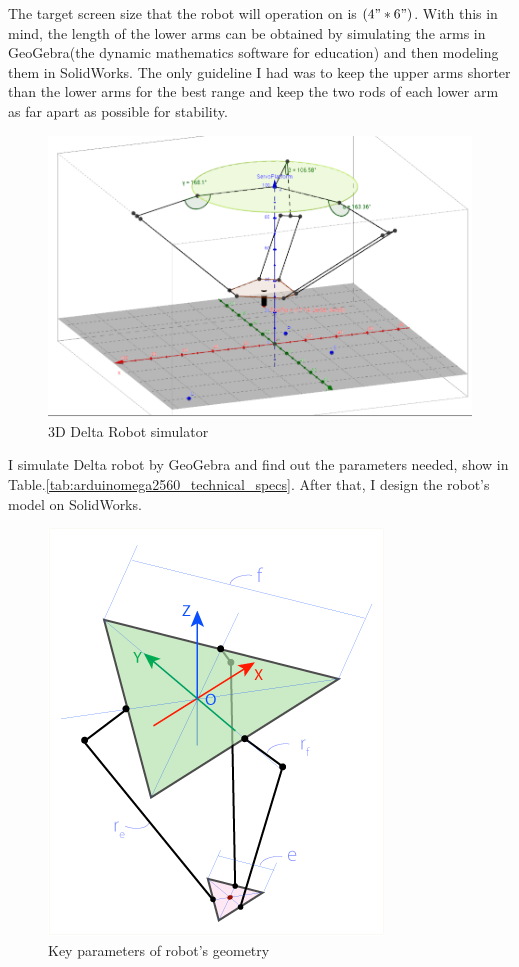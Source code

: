 The target screen size that the robot will operation on is $(4" \ast 6")$. With this in mind, the length of the lower arms can be obtained by simulating the arms in GeoGebra\cite{GeoGebra_thesis}(the dynamic mathematics software for education) and then modeling them in SolidWorks. The only guideline I had was to keep the upper arms shorter than the lower arms for the best range and keep the two rods of each lower arm as far apart as possible for stability.
\begin{figure}[H]	
	\centering
	\includegraphics[width=\maxwidth{15cm}, keepaspectratio]{Chapters/Fig/3D_delta_robot_simulator.png}
	\caption{3D Delta Robot simulator\cite{GeoGebra_deltarobot_simulator_thesis}}
	\label{fig:3D_delta_robot_simulator}
\end{figure}

I simulate Delta robot by GeoGebra and find out the parameters needed, show in Table.\ref{tab:arduinomega2560_technical_specs}. After that, I design the robot's model on SolidWorks.
\begin{figure}[H]
	\centering
	\includegraphics[width=\maxwidth{15cm}, keepaspectratio]{Chapters/Fig/key_parameters.png}
	\caption{Key parameters of robot's geometry}
	\label{fig:key_parameters}
\end{figure}

